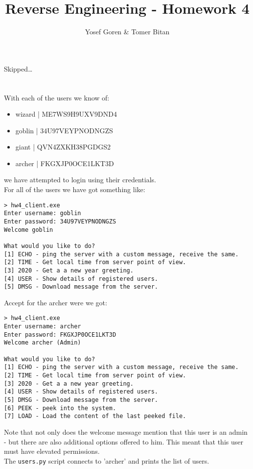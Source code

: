 \documentclass{article}
\begin{document}
\author{Yosef Goren \& Tomer Bitan}
\title{Reverse Engineering - Homework 4}
\maketitle

\section{}
Skipped\dots
\section{}
With each of the users we know of:
\begin{itemize}
    \item wizard | ME7WS9H9UXV9DND4
    \item goblin | 34U97VEYPNODNGZS
    \item giant | QVN4ZXKH38PGDGS2
    \item archer | FKGXJP0OCE1LKT3D
\end{itemize}
we have attempted to login using their credentials.\\
For all of the users we have got something like:
\begin{lstlisting}
> hw4_client.exe
Enter username: goblin
Enter password: 34U97VEYPNODNGZS
Welcome goblin

What would you like to do?
[1] ECHO - ping the server with a custom message, receive the same.
[2] TIME - Get local time from server point of view.
[3] 2020 - Get a a new year greeting.
[4] USER - Show details of registered users.
[5] DMSG - Download message from the server.
\end{lstlisting}
Accept for the archer were we got:
\begin{lstlisting}
> hw4_client.exe
Enter username: archer
Enter password: FKGXJP0OCE1LKT3D
Welcome archer (Admin)

What would you like to do?
[1] ECHO - ping the server with a custom message, receive the same.
[2] TIME - Get local time from server point of view.
[3] 2020 - Get a a new year greeting.
[4] USER - Show details of registered users.
[5] DMSG - Download message from the server.
[6] PEEK - peek into the system.
[7] LOAD - Load the content of the last peeked file.
\end{lstlisting}
Note that not only does the welcome message mention that this user is an admin
- but there are also additional options offered to him. This meant that this 
user must have elevated permissions.\\
The \texttt{users.py} script connects to 'archer' and prints the list of users.
\end{document}
